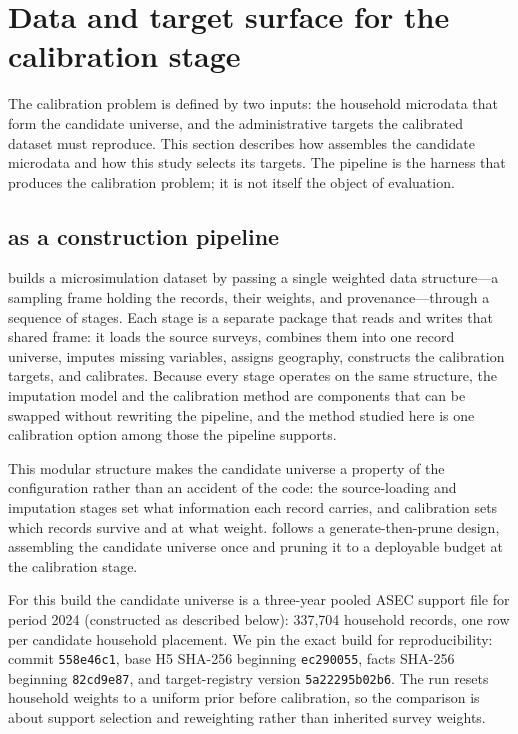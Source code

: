 \section{Data and target surface for the calibration stage}
\label{sp:sec:data}

The calibration problem is defined by two inputs: the household microdata that form the candidate
universe, and the administrative targets the calibrated dataset must reproduce. This section
describes how \populace{} assembles the candidate microdata and how this study selects its targets.
The pipeline is the harness that produces the calibration problem; it is not itself the object of
evaluation.

\subsection{\populace{} as a construction pipeline}

\populace{} builds a microsimulation dataset by passing a single weighted data structure---a sampling
frame holding the records, their weights, and provenance---through a sequence of stages. Each stage is
a separate package that reads and writes that shared frame: it loads the source surveys, combines them
into one record universe, imputes missing variables, assigns geography, constructs the calibration
targets, and calibrates. Because every stage operates on the same structure, the imputation model and
the calibration method are components that can be swapped without rewriting the pipeline, and the
method studied here is one calibration option among those the pipeline supports.

This modular structure makes the candidate universe a property of the configuration rather than an
accident of the code: the source-loading and imputation stages set what information each record
carries, and calibration sets which records survive and at what weight. \populace{} follows a
generate-then-prune design, assembling the candidate universe once and pruning it to a deployable
budget at the calibration stage.

For this build the candidate universe is a three-year pooled ASEC support file for period 2024
(constructed as described below): 337{,}704 household records, one row per candidate household placement.
We pin the exact build for
reproducibility: \populace{} commit \texttt{558e46c1}, base H5 SHA-256 beginning
\texttt{ec290055}, \chronicle{} facts SHA-256 beginning \texttt{82cd9e87}, and target-registry version
\texttt{5a22295b02b6}. The run resets household weights to a uniform prior before calibration, so the
comparison is about support selection and reweighting rather than inherited survey weights.

